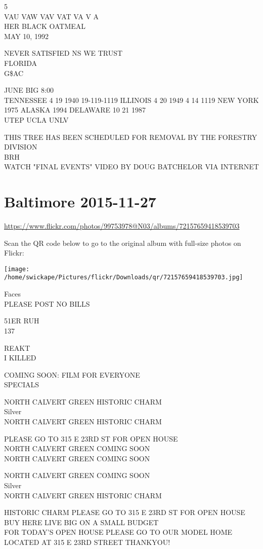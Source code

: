 \documentclass[10pt,letterpaper]{article}
\begin{document}
5\\
VAU VAW VAV VAT VA V A\\
HER BLACK OATMEAL\\
MAY 10, 1992

NEVER SATISFIED NS WE TRUST\\
FLORIDA\\
G\$AC

JUNE BIG 8:00\\
TENNESSEE 4 19 1940 19{-}119{-}1119 ILLINOIS 4 20 1949 4 14 1119 NEW YORK 1975 ALASKA 1994 DELAWARE 10 21 1987\\
UTEP UCLA UNLV

THIS TREE HAS BEEN SCHEDULED FOR REMOVAL BY THE FORESTRY DIVISION\\
BRH\\
WATCH "FINAL EVENTS" VIDEO BY DOUG BATCHELOR VIA INTERNET


\section*{Baltimore 2015-11-27}

\url{https://www.flickr.com/photos/99753978@N03/albums/72157659418539703}

Scan the QR code below to go to the original album with full-size photos on Flickr:

\texttt{[image: /home/swickape/Pictures/flickr/Downloads/qr/72157659418539703.jpg]}


Faces\\
PLEASE POST NO BILLS

51ER RUH\\
137

REAKT\\
I KILLED

COMING SOON: FILM FOR EVERYONE\\
SPECIALS

NORTH CALVERT GREEN HISTORIC CHARM\\
Silver\\
NORTH CALVERT GREEN HISTORIC CHARM

PLEASE GO TO 315 E 23RD ST FOR OPEN HOUSE\\
NORTH CALVERT GREEN COMING SOON\\
NORTH CALVERT GREEN COMING SOON

NORTH CALVERT GREEN COMING SOON\\
Silver\\
NORTH CALVERT GREEN HISTORIC CHARM

HISTORIC CHARM PLEASE GO TO 315 E 23RD ST FOR OPEN HOUSE\\
BUY HERE LIVE BIG ON A SMALL BUDGET\\
FOR TODAY'S OPEN HOUSE PLEASE GO TO OUR MODEL HOME LOCATED AT 315 E 23RD STREET THANKYOU!
\end{document}
